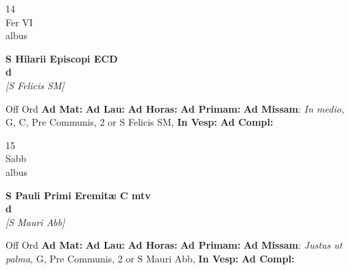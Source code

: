 \documentclass[10pt, openany]{book}
\begin{document}
        \begin{center}
            \begin{minipage}{3.5in}
                \vspace{2em}
                \begin{minipage}{0.5in}
                    {\Huge 14} \\
                    {\normalsize Fer VI} \\
                    {\normalsize albus}
                \end{minipage}
                \begin{minipage}{3.0in}
                    \textbf{ \large S Hilarii Episcopi ECD \\
                    \textnormal{\normalsize d}} \\ \textit{[S Felicis SM]} \\ 
                \end{minipage}
                \begin{justify}Off Ord
                    \textbf{Ad Mat: }
                    \textbf{Ad Lau: }
                    \textbf{Ad Horas: }
                    \textbf{Ad Primam: }\textbf{Ad Missam}: \textit{In medio,} G, C, Pre Communis, 2 or S Felicis SM,  
                    \textbf{In Vesp: }
                    \textbf{Ad Compl: }
                \end{justify}
            \end{minipage}
        \end{center}
    
        \begin{center}
            \begin{minipage}{3.5in}
                \vspace{2em}
                \begin{minipage}{0.5in}
                    {\Huge 15} \\
                    {\normalsize Sabb} \\
                    {\normalsize albus}
                \end{minipage}
                \begin{minipage}{3.0in}
                    \textbf{ \large S Pauli Primi Eremitæ C mtv \\
                    \textnormal{\normalsize d}} \\ \textit{[S Mauri Abb]} \\ 
                \end{minipage}
                \begin{justify}Off Ord
                    \textbf{Ad Mat: }
                    \textbf{Ad Lau: }
                    \textbf{Ad Horas: }
                    \textbf{Ad Primam: }\textbf{Ad Missam}: \textit{Justus ut palma,} G, Pre Communis, 2 or S Mauri Abb,  
                    \textbf{In Vesp: }
                    \textbf{Ad Compl: }
                \end{justify}
            \end{minipage}
        \end{center}
    
\end{document}

